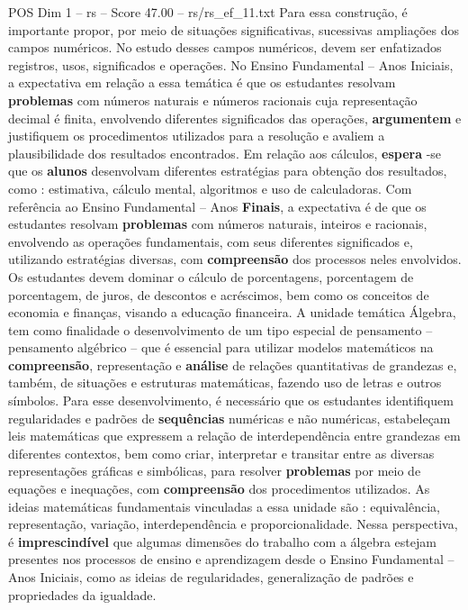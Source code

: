 \begin{textsample}{POS Dim 1 – rs – Score 47.00 – rs/rs\_ef\_11.txt}
Para essa construção, é importante propor, por meio de situações significativas, sucessivas ampliações dos campos numéricos.
No estudo desses campos numéricos, devem ser enfatizados registros, usos, significados e operações.
No Ensino Fundamental – Anos Iniciais, a expectativa em relação a essa temática é que os estudantes resolvam \textbf{problemas} com números naturais e números racionais cuja representação decimal é finita, envolvendo diferentes significados das operações, \textbf{argumentem} e justifiquem os procedimentos utilizados para a resolução e avaliem a plausibilidade dos resultados encontrados.
Em relação aos cálculos, \textbf{espera} -se que os \textbf{alunos} desenvolvam diferentes estratégias para obtenção dos resultados, como : estimativa, cálculo mental, algoritmos e uso de calculadoras.
Com referência ao Ensino Fundamental – Anos \textbf{Finais}, a expectativa é de que os estudantes resolvam \textbf{problemas} com números naturais, inteiros e racionais, envolvendo as operações fundamentais, com seus diferentes significados e, utilizando estratégias diversas, com \textbf{compreensão} dos processos neles envolvidos.
Os estudantes devem dominar o cálculo de porcentagens, porcentagem de porcentagem, de juros, de descontos e acréscimos, bem como os conceitos de economia e finanças, visando a educação financeira.
A unidade temática Álgebra, tem como finalidade o desenvolvimento de um tipo especial de pensamento – pensamento algébrico – que é essencial para utilizar modelos matemáticos na \textbf{compreensão}, representação e \textbf{análise} de relações quantitativas de grandezas e, também, de situações e estruturas matemáticas, fazendo uso de letras e outros símbolos.
Para esse desenvolvimento, é necessário que os estudantes identifiquem regularidades e padrões de \textbf{sequências} numéricas e não numéricas, estabeleçam leis matemáticas que expressem a relação de interdependência entre grandezas em diferentes contextos, bem como criar, interpretar e transitar entre as diversas representações gráficas e simbólicas, para resolver \textbf{problemas} por meio de equações e inequações, com \textbf{compreensão} dos procedimentos utilizados.
As ideias matemáticas fundamentais vinculadas a essa unidade são : equivalência, representação, variação, interdependência e proporcionalidade.
Nessa perspectiva, é \textbf{imprescindível} que algumas dimensões do trabalho com a álgebra estejam presentes nos processos de ensino e aprendizagem desde o Ensino Fundamental – Anos Iniciais, como as ideias de regularidades, generalização de padrões e propriedades da igualdade.

\end{textsample}
